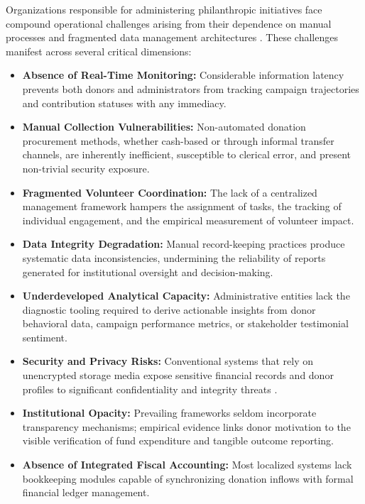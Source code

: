 \documentclass{thesis-library}
\begin{document}
Organizations responsible for administering philanthropic initiatives face compound operational challenges arising from their dependence on manual processes and fragmented data management architectures \cite{barnes2018rise,sander2021digital}. These challenges manifest across several critical dimensions:
\begin{itemize}
    \item \textbf{Absence of Real-Time Monitoring:} Considerable information latency prevents both donors and administrators from tracking campaign trajectories and contribution statuses with any immediacy.
    \item \textbf{Manual Collection Vulnerabilities:} Non-automated donation procurement methods, whether cash-based or through informal transfer channels, are inherently inefficient, susceptible to clerical error, and present non-trivial security exposure.
    \item \textbf{Fragmented Volunteer Coordination:} The lack of a centralized management framework hampers the assignment of tasks, the tracking of individual engagement, and the empirical measurement of volunteer impact.
    \item \textbf{Data Integrity Degradation:} Manual record-keeping practices produce systematic data inconsistencies, undermining the reliability of reports generated for institutional oversight and decision-making.
    \item \textbf{Underdeveloped Analytical Capacity:} Administrative entities lack the diagnostic tooling required to derive actionable insights from donor behavioral data, campaign performance metrics, or stakeholder testimonial sentiment.
    \item \textbf{Security and Privacy Risks:} Conventional systems that rely on unencrypted storage media expose sensitive financial records and donor profiles to significant confidentiality and integrity threats \cite{owasp2021top10,iso27001security}.
    \item \textbf{Institutional Opacity:} Prevailing frameworks seldom incorporate transparency mechanisms; empirical evidence links donor motivation to the visible verification of fund expenditure and tangible outcome reporting.
    \item \textbf{Absence of Integrated Fiscal Accounting:} Most localized systems lack bookkeeping modules capable of synchronizing donation inflows with formal financial ledger management.
\end{itemize}
\end{document}
